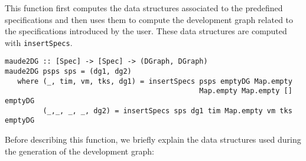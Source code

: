 This function first computes the data structures associated to the
predefined specifications and then uses them to compute the development
graph related to the specifications introduced by the user. These
data structures are computed with \verb"insertSpecs".

{\codesize
\begin{verbatim}
maude2DG :: [Spec] -> [Spec] -> (DGraph, DGraph)
maude2DG psps sps = (dg1, dg2)
   where (_, tim, vm, tks, dg1) = insertSpecs psps emptyDG Map.empty 
                                              Map.empty Map.empty [] emptyDG
         (_,_, _, _, dg2) = insertSpecs sps dg1 tim Map.empty vm tks emptyDG
\end{verbatim}
}


Before describing this function,
we briefly explain the data structures used during the generation of
the development graph:

